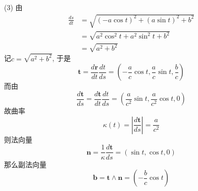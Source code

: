 \begin{tcolorbox}
	(3)
	由
	\begin{equation*}
		\begin{split}
			\frac{ds}{dt}
			&=\sqrt{(-a\cos t)^2+(a\sin t)^2+b^2} \\
			&=\sqrt{a^2\cos^2t+a^2\sin^2t+b^2} \\
			&= \sqrt{a^2+b^2}
		\end{split}
	\end{equation*}
	记$c=\sqrt{a^2+b^2}$,
	于是
	\begin{equation*}
		\boldsymbol{t}=\frac{d\boldsymbol{r}}{dt}\frac{dt}{ds}
		=(-\frac{a}{c}\cos t,\frac{a}{c}\sin t,\frac{b}{c})
	\end{equation*}
	而由
	\begin{equation*}
		\frac{d\boldsymbol{t}}{ds}=\frac{d\boldsymbol{t}}{dt}\frac{dt}{ds}
		=(\frac{a}{c^2}\sin t,\frac{a}{c^2}\cos t,0)
	\end{equation*}
	故曲率
	\begin{equation*}
		\kappa(t)=|\frac{d\boldsymbol{t}}{ds}|=\frac{a}{c^2}
	\end{equation*}
	则法向量
	\begin{equation*}
		\boldsymbol{n}=\frac{1}{\kappa}\frac{d\boldsymbol{t}}{ds}=(\sin t,\cos t,0)
	\end{equation*}
	那么副法向量
	\begin{equation*}
		\boldsymbol{b}=\boldsymbol{t}\wedge\boldsymbol{n}
		=(-\frac{b}{c}\cos t)
	\end{equation*}
	

\end{tcolorbox}
